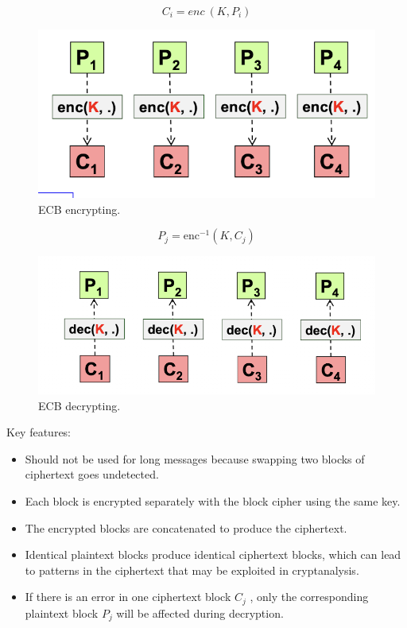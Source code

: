 \begin{multicols}{2}
    \begin{equation*}
        \boxed{C_i = enc \ (K, P_i)}
    \end{equation*}
    \begin{figure}[H]
        \includegraphics[width=\linewidth]{Images/Cryptography/ECBEncrypt.png}
        \caption{ECB encrypting.}
    \end{figure}
    \columnbreak
    \begin{equation*}
        \boxed{P_j = \text{enc}^{-1}(K, C_j)}
    \end{equation*}
    \begin{figure}[H]
        \includegraphics[width=\linewidth]{Images/Cryptography/ECBDecrypt.png}
        \caption{ECB decrypting.}
    \end{figure}
\end{multicols}

Key features:
\begin{itemize}
    \item Should not be used for long messages because swapping two blocks of ciphertext goes undetected.
    \item Each block is encrypted separately with the block cipher using the same key.
    \item The encrypted blocks are concatenated to produce the ciphertext.
    \item Identical plaintext blocks produce identical ciphertext blocks, which can lead to patterns in the ciphertext that may be exploited in cryptanalysis.
    \item If there is an error in one ciphertext block  $C_j$ , only the corresponding plaintext block  $P_j$  will be affected during decryption.
\end{itemize}

